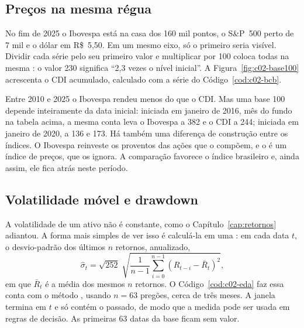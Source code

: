 \subsection{Preços na mesma régua}

No fim de 2025 o Ibovespa está na casa dos 160 mil pontos, o S\&P~500 perto de 7 mil e o dólar em R\$~5,50. Em um mesmo eixo, só o primeiro seria visível. Dividir cada série pelo seu primeiro valor e multiplicar por 100 coloca todas na mesma : o valor 230 significa ``2,3 vezes o nível inicial''. A Figura~\ref{fig:c02-base100} acrescenta o CDI acumulado, calculado com a série do Código~\ref{cod:c02-bcb}.

Entre 2010 e 2025 o Ibovespa rendeu menos do que o CDI. Mas uma base 100 depende inteiramente da data inicial: iniciada em janeiro de 2016, mês do fundo na tabela acima, a mesma conta leva o Ibovespa a 382 e o CDI a 244; iniciada em janeiro de 2020, a 136 e 173. Há também uma diferença de construção entre os índices. O Ibovespa reinveste os proventos das ações que o compõem, e o  é um índice de preços, que os ignora. A comparação favorece o índice brasileiro e, ainda assim, ele fica atrás neste período.


\subsection{Volatilidade móvel e drawdown}

A volatilidade de um ativo não é constante, como o Capítulo~\ref{cap:retornos} adiantou. A forma mais simples de ver isso é calculá-la em uma : em cada data $t$, o desvio-padrão dos últimos $n$ retornos, anualizado,
\begin{equation}
  \hat\sigma_t = \sqrt{252} \; \sqrt{\frac{1}{n-1} \sum_{i=0}^{n-1} \left(R_{t-i} - \bar R_t\right)^2} ,
  \label{eq:c02-vol-movel}
\end{equation}
em que $\bar R_t$ é a média dos mesmos $n$ retornos. O Código~\ref{cod:c02-eda} faz essa conta com o método , usando $n = 63$ pregões, cerca de três meses. A janela termina em $t$ e só contém o passado, de modo que a medida pode ser usada em regras de decisão. As primeiras 63 datas da base ficam sem valor.

